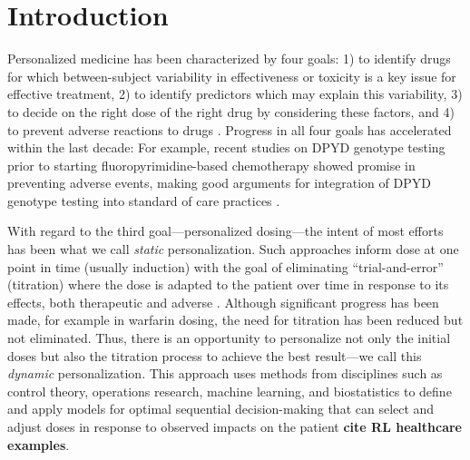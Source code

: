 \section{Introduction}

Personalized medicine has been characterized by four goals: 1) to identify drugs for which between-subject variability in effectiveness or toxicity is a key issue for effective treatment, 2) to identify predictors which may explain this variability, 3) to decide on the right dose of the right drug by considering these factors, and 4) to prevent adverse reactions to drugs \cite{morse2015personalized}.  Progress in all four goals has accelerated within the last decade: For example, recent studies on DPYD genotype testing prior to starting fluoropyrimidine-based chemotherapy showed promise in preventing adverse events, making good arguments for integration of DPYD genotype testing into standard of care practices \cite{wigle2019prospective}.  

With regard to the third goal---personalized dosing---the intent of most efforts has been what we call \textit{static} personalization. Such approaches inform dose at one point in time (usually induction) with the goal of eliminating ``trial-and-error'' (titration) where the dose is adapted to the patient over time in response to its effects, both therapeutic and adverse \cite{morse2015personalized}. Although significant progress has been made, for example in warfarin dosing, the need for titration has been reduced but not eliminated. Thus, there is an opportunity to personalize not only the initial doses but also the titration process to achieve the best result---we call this \textit{dynamic} personalization. This approach uses methods from disciplines such as control theory, operations research, machine learning, and biostatistics to define and apply models for optimal sequential decision-making that can select and adjust doses in response to observed impacts on the patient \textbf{cite RL healthcare examples}.

